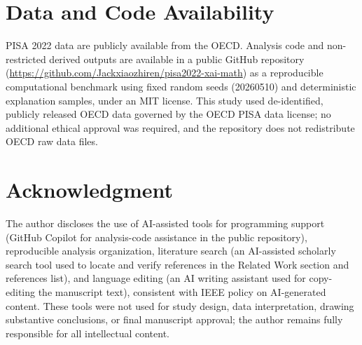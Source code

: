 \documentclass[journal]{IEEEtran}
\begin{document}
\section*{Data and Code Availability}
PISA 2022 data are publicly available from the OECD. Analysis code and non-restricted derived outputs are available in a public GitHub repository (\url{https://github.com/Jackxiaozhiren/pisa2022-xai-math}) as a reproducible computational benchmark using fixed random seeds (20260510) and deterministic explanation samples, under an MIT license. This study used de-identified, publicly released OECD data governed by the OECD PISA data license; no additional ethical approval was required, and the repository does not redistribute OECD raw data files.

\section*{Acknowledgment}
The author discloses the use of AI-assisted tools for programming support (GitHub Copilot for analysis-code assistance in the public repository), reproducible analysis organization, literature search (an AI-assisted scholarly search tool used to locate and verify references in the Related Work section and references list), and language editing (an AI writing assistant used for copy-editing the manuscript text), consistent with IEEE policy on AI-generated content. These tools were not used for study design, data interpretation, drawing substantive conclusions, or final manuscript approval; the author remains fully responsible for all intellectual content.



\end{document}
